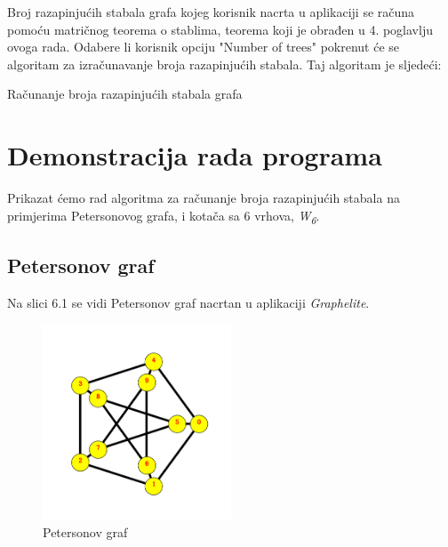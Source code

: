 \documentclass[times, utf8, zavrsni]{fer}
\begin{document}
Broj razapinjućih stabala grafa kojeg korisnik nacrta u aplikaciji se računa pomoću matričnog teorema o stablima, teorema koji je obrađen u 4. poglavlju ovoga rada. Odabere li korisnik opciju "Number of trees" pokrenut će se algoritam za izračunavanje broja razapinjućih stabala. Taj algoritam je sljedeći:

\begin{algorithm}
	\caption{Računanje broja razapinjućih stabala grafa}
	\label{algo:spanning-trees}
	\begin{algorithmic}
						\ENDIF
					\ENDFOR
				\ELSE
				\ENDIF
			\ENDFOR
		\ENDFOR
	\end{algorithmic}
\end{algorithm}

\newpage

\section{Demonstracija rada programa}

Prikazat ćemo rad algoritma za računanje broja razapinjućih stabala na primjerima Petersonovog grafa, i kotača sa 6 vrhova, \textit{W\textsubscript{6}}.

\subsection{Petersonov graf}

Na slici 6.1 se vidi Petersonov graf nacrtan u aplikaciji \textit{Graphelite}.

\begin{figure}[htb]
	\centering
	\includegraphics[width=0.5\textwidth]{slike/petersonov.png}
	\caption{Petersonov graf}
	\label{fig:petersonov}
\end{figure}
\end{document}

